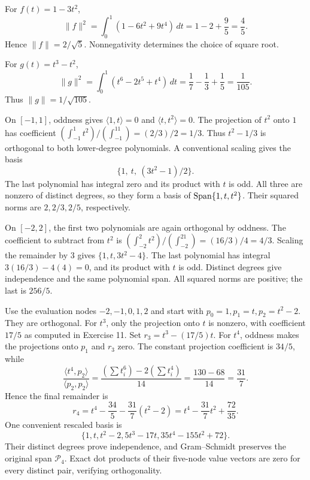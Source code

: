 For $f(t)=1-3t^2$,
\[
 \|f\|^2=\int_0^1(1-6t^2+9t^4)\,dt
 =1-2+\frac95=\frac45.
\]
Hence $\boxed{\|f\|=2/\sqrt5}$. Nonnegativity determines the choice
of square root.

For $g(t)=t^3-t^2$,
\[
 \|g\|^2=\int_0^1(t^6-2t^5+t^4)\,dt
 =\frac17-\frac13+\frac15=\frac1{105}.
\]
Thus $\boxed{\|g\|=1/\sqrt{105}}$.

On $[-1,1]$, oddness gives $\langle1,t\rangle=0$ and
$\langle t,t^2\rangle=0$. The projection of $t^2$ onto $1$
has coefficient $(\int_{-1}^1t^2)/(\int_{-1}^11)=(2/3)/2=1/3$.
Thus $t^2-1/3$ is orthogonal to both lower-degree polynomials.
A conventional scaling gives the basis
\[
 \boxed{\{1,\ t,\ (3t^2-1)/2\}}.
\]
The last polynomial has integral zero and its product with $t$ is odd.
All three are nonzero of distinct degrees, so they form a basis of
$\operatorname{Span}\{1,t,t^2\}$. Their squared norms are $2,2/3,2/5$, respectively.

On $[-2,2]$, the first two polynomials are again orthogonal by oddness.
The coefficient to subtract from $t^2$ is
$(\int_{-2}^2t^2)/(\int_{-2}^21)=(16/3)/4=4/3$.
Scaling the remainder by $3$ gives
$\boxed{\{1,t,3t^2-4\}}$.
The last polynomial has integral $3(16/3)-4(4)=0$, and its
product with $t$ is odd. Distinct degrees give independence and the
same polynomial span. All squared norms are positive; the last is $256/5$.

Use the evaluation nodes $-2,-1,0,1,2$ and start with
$p_0=1,p_1=t,p_2=t^2-2$. They are orthogonal.
For $t^3$, only the projection onto $t$ is nonzero, with coefficient
$17/5$ as computed in Exercise 11. Set $r_3=t^3-(17/5)t$.
For $t^4$, oddness makes the projections onto $p_1$ and $r_3$
zero. The constant projection coefficient is $34/5$, while
\[
 \frac{\langle t^4,p_2\rangle}{\langle p_2,p_2\rangle}
 =\frac{(\sum t_i^6)-2(\sum t_i^4)}{14}
 =\frac{130-68}{14}=\frac{31}{7}.
\]
Hence the final remainder is
\[
 r_4=t^4-\frac{34}{5}-\frac{31}{7}(t^2-2)
 =t^4-\frac{31}{7}t^2+\frac{72}{35}.
\]
One convenient rescaled basis is
\[
 \boxed{\{1,t,t^2-2,5t^3-17t,35t^4-155t^2+72\}}.
\]
Their distinct degrees prove independence, and Gram--Schmidt preserves
the original span $\mathcal P_4$. Exact dot products of their five-node
value vectors are zero for every distinct pair, verifying orthogonality.

